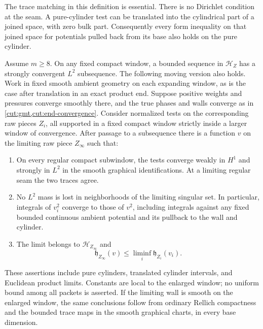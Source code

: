 The trace matching in this definition is essential.  There is no
Dirichlet condition at the seam.  A pure-cylinder test can be translated
into the cylindrical part of a joined space, with zero bulk part.
Consequently every form inequality on that joined space for potentials
pulled back from its base also holds on the pure cylinder.

\begin{lemma}\label{shield:compactness}
Assume $m\ge8$.  On any fixed compact window, a bounded sequence in
$\mathcal H_Z$ has a strongly convergent $L^2$ subsequence.  The following
moving version also holds.  Work in fixed smooth ambient geometry on each expanding window,
as is the case after translation in an exact product end.  Suppose
positive weights and pressures converge smoothly there, and the true
phases and walls converge as in \cref{cut:gmt,cut:end-convergence}.
Consider normalized tests on the corresponding raw pieces $Z_i$, all
supported in a fixed compact window strictly inside a larger window of
convergence.  After passage to a subsequence there is a function $v$ on
the limiting raw piece $Z_\infty$ such that:
\begin{enumerate}[label=\textup{(\roman*)}]
\item On every regular compact subwindow, the tests converge weakly in
$H^1$ and strongly in $L^2$ in the smooth graphical identifications.  At
a limiting regular seam the two traces agree.
\item No $L^2$ mass is lost in neighborhoods of the limiting singular
set.  In particular, integrals of $v_i^2$ converge to those of $v^2$,
including integrals against any fixed bounded continuous ambient
potential and its pullback to the wall and cylinder.
\item The limit belongs to $\mathcal H_{Z_\infty}$ and
\begin{equation}\label{shield:liminf}
 \mathfrak h_{Z_\infty}(v)
       \le\liminf_i\mathfrak h_{Z_i}(v_i).
\end{equation}
\end{enumerate}
These assertions include pure cylinders, translated cylinder intervals,
and Euclidean product limits.  Constants are local to the enlarged
window; no uniform bound among all packets is asserted.
If the limiting wall is smooth on the enlarged window, the same
conclusions follow from ordinary Rellich compactness and the bounded
trace maps in the smooth graphical charts, in every base dimension.
\end{lemma}

